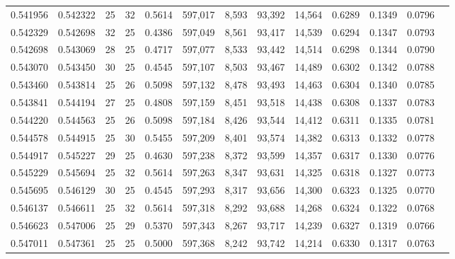 \begin{tabular}{rrrrrrrrrrrrr}
0.541956 & 0.542322 &    25 &  32 &                                     0.5614 & 597,017 &   8,593 &  93,392 &  14,564 & 0.6289 & 0.1349 & 0.0796 \\
0.542329 & 0.542698 &    32 &  25 &                                     0.4386 & 597,049 &   8,561 &  93,417 &  14,539 & 0.6294 & 0.1347 & 0.0793 \\
0.542698 & 0.543069 &    28 &  25 &                                     0.4717 & 597,077 &   8,533 &  93,442 &  14,514 & 0.6298 & 0.1344 & 0.0790 \\
0.543070 & 0.543450 &    30 &  25 &                                     0.4545 & 597,107 &   8,503 &  93,467 &  14,489 & 0.6302 & 0.1342 & 0.0788 \\
0.543460 & 0.543814 &    25 &  26 &                                     0.5098 & 597,132 &   8,478 &  93,493 &  14,463 & 0.6304 & 0.1340 & 0.0785 \\
0.543841 & 0.544194 &    27 &  25 &                                     0.4808 & 597,159 &   8,451 &  93,518 &  14,438 & 0.6308 & 0.1337 & 0.0783 \\
0.544220 & 0.544563 &    25 &  26 &                                     0.5098 & 597,184 &   8,426 &  93,544 &  14,412 & 0.6311 & 0.1335 & 0.0781 \\
0.544578 & 0.544915 &    25 &  30 &                                     0.5455 & 597,209 &   8,401 &  93,574 &  14,382 & 0.6313 & 0.1332 & 0.0778 \\
0.544917 & 0.545227 &    29 &  25 &                                     0.4630 & 597,238 &   8,372 &  93,599 &  14,357 & 0.6317 & 0.1330 & 0.0776 \\
0.545229 & 0.545694 &    25 &  32 &                                     0.5614 & 597,263 &   8,347 &  93,631 &  14,325 & 0.6318 & 0.1327 & 0.0773 \\
0.545695 & 0.546129 &    30 &  25 &                                     0.4545 & 597,293 &   8,317 &  93,656 &  14,300 & 0.6323 & 0.1325 & 0.0770 \\
0.546137 & 0.546611 &    25 &  32 &                                     0.5614 & 597,318 &   8,292 &  93,688 &  14,268 & 0.6324 & 0.1322 & 0.0768 \\
0.546623 & 0.547006 &    25 &  29 &                                     0.5370 & 597,343 &   8,267 &  93,717 &  14,239 & 0.6327 & 0.1319 & 0.0766 \\
0.547011 & 0.547361 &    25 &  25 &                                     0.5000 & 597,368 &   8,242 &  93,742 &  14,214 & 0.6330 & 0.1317 & 0.0763 \\

\end{tabular}
